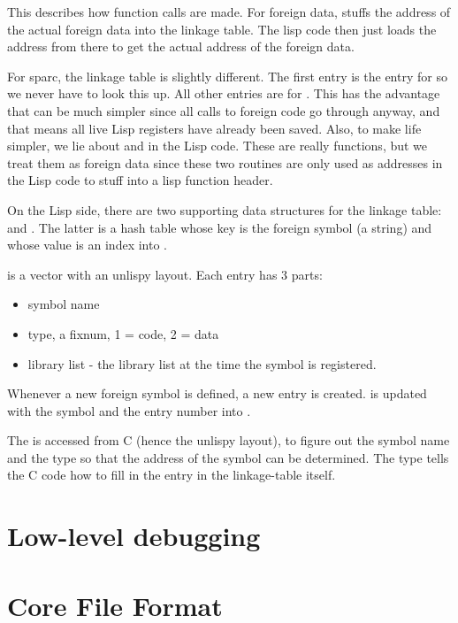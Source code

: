 This describes how function calls are made. For foreign data,
 stuffs the address of the actual foreign
data into the linkage table. The lisp code then just loads the address
from there to get the actual address of the foreign data.

For sparc, the linkage table is slightly different. The first entry is
the entry for  so we never have to look this up. All
other entries are for . This has the
advantage that  can be much simpler since
all calls to foreign code go through  anyway, and
that means all live Lisp registers have already been saved. Also, to
make life simpler, we lie about  and
 in the Lisp code. These are really functions,
but we treat them as foreign data since these two routines are only
used as addresses in the Lisp code to stuff into a lisp function
header.

On the Lisp side, there are two supporting data structures for the
linkage table:  and
. The latter is a hash table whose key
is the foreign symbol (a string) and whose value is an index into
.

 is a vector with an unlispy layout. Each
entry has 3 parts:

\begin{itemize}
\item symbol name
\item type, a fixnum, 1 = code, 2 = data
\item library list - the library list at the time the symbol is registered.
\end{itemize}

Whenever a new foreign symbol is defined, a new
 entry is created.
 is updated with the symbol and the
entry number into .

The  is accessed from C (hence the unlispy
layout), to figure out the symbol name and the type so that the
address of the symbol can be determined.  The type tells the C code
how to fill in the entry in the linkage-table itself.



\chapter{Low-level debugging}

\chapter{Core File Format}
